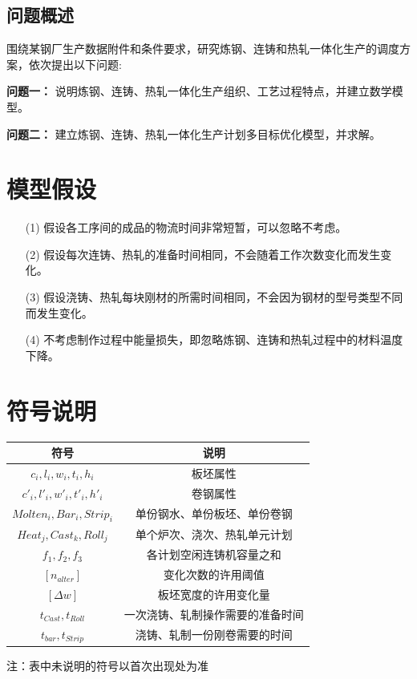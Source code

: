 \documentclass{whutmod}
\begin{document}
\subsection{问题概述}
围绕某钢厂生产数据附件和条件要求，研究炼钢、连铸和热轧一体化生产的调度方案，依次提出以下问题:

\textbf{问题一：} 说明炼钢、连铸、热轧一体化生产组织、工艺过程特点，并建立数学模型。

\textbf{问题二：} 建立炼钢、连铸、热轧一体化生产计划多目标优化模型，并求解。

\section{模型假设}

\begin{itemize}                                             
\item [(1)] 假设各工序间的成品的物流时间非常短暂，可以忽略不考虑。
\item [(2)] 假设每次连铸、热轧的准备时间相同，不会随着工作次数变化而发生变化。
\item [(3)] 假设浇铸、热轧每块刚材的所需时间相同，不会因为钢材的型号类型不同而发生变化。
\item [(4)] 不考虑制作过程中能量损失，即忽略炼钢、连铸和热轧过程中的材料温度下降。
\end{itemize}

\section{符号说明}
\begin{table}[H]
\centering
{}  %
\setlength{\tabcolsep}{12mm}
\begin{tabular}{cc}
\toprule[1.5pt]
\multicolumn{1}{m{4cm}}{\centering 符号} & \multicolumn{1}{m{6cm}}{\centering 说明} \\
\midrule[1pt]		
$c_i, l_i, w_i, t_i, h_i$  & 板坯属性  \\ 
$c'_i, l'_i, w'_i, t'_i, h'_i$  & 卷钢属性  \\ 
$Molten_i, Bar_i, Strip_i$  & 单份钢水、单份板坯、单份卷钢  \\
$Heat_j, Cast_k, Roll_j$  & 单个炉次、浇次、热轧单元计划  \\ 
$f_1, f_2, f_3$  & 各计划空闲连铸机容量之和 \\   
$[n_{alter}]$  & 变化次数的许用阈值 \\   
$[\Delta w]$  & 板坯宽度的许用变化量 \\
$t_{Cast}, t_{Roll}$  & 一次浇铸、轧制操作需要的准备时间 \\  
$t_{bar}, t_{Strip}$  & 浇铸、轧制一份刚卷需要的时间 \\     
\bottomrule[1.5pt]
\end{tabular}
\begin{tablenotes}
\item 注：表中未说明的符号以首次出现处为准
\end{tablenotes}
\end{table}
\end{document}
